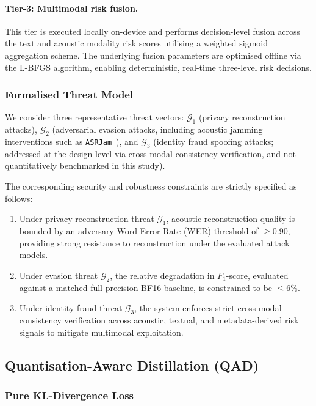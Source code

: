 \documentclass[a4paper,fleqn]{cas-sc}
\begin{document}
\paragraph{Tier-3: Multimodal risk fusion.}
This tier is executed locally on-device and performs decision-level fusion across the text and acoustic modality risk scores utilising a weighted sigmoid aggregation scheme. The underlying fusion parameters are optimised offline via the L-BFGS algorithm, enabling deterministic, real-time three-level risk decisions.

\subsubsection{Formalised Threat Model}\label{Formalised_Threat_Model}

We consider three representative threat vectors: $\mathcal{G}_1$ (privacy reconstruction attacks), $\mathcal{G}_2$ (adversarial evasion attacks, including acoustic jamming interventions such as \texttt{ASRJam}~\citep{19}), and $\mathcal{G}_3$ (identity fraud spoofing attacks; addressed at the design level via cross-modal consistency verification, and not quantitatively benchmarked in this study).

The corresponding security and robustness constraints are strictly specified as follows:
\begin{enumerate}
    \item[\text{(i)}] Under privacy reconstruction threat $\mathcal{G}_1$, acoustic reconstruction quality is bounded by an adversary Word Error Rate (WER) threshold of $\ge 0.90$, providing strong resistance to reconstruction under the evaluated attack models.
    \item[\text{(ii)}] Under evasion threat $\mathcal{G}_2$, the relative degradation in $F_1$-score, evaluated against a matched full-precision BF16 baseline, is constrained to be $\le 6\%$.
    \item[\text{(iii)}] Under identity fraud threat $\mathcal{G}_3$, the system enforces strict cross-modal consistency verification across acoustic, textual, and metadata-derived risk signals to mitigate multimodal exploitation.
\end{enumerate}

\subsection{Quantisation-Aware Distillation (QAD)}
\subsubsection{Pure KL-Divergence Loss}
\end{document}

